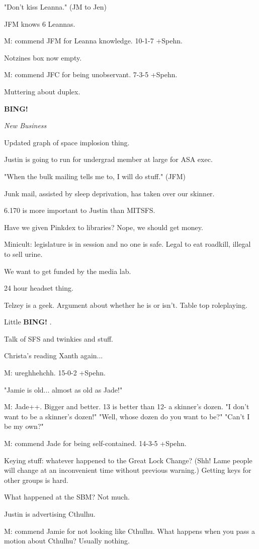 \documentclass[12pt]{article}
\newcommand{\bing}{{\bf BING!} }
\newcommand{\goto}[1]{\bing \vskip 12pt \centerline{{\em{#1}}}}
\begin{document}
"Don't kiss Leanna." (JM to Jen)

JFM knows 6 Leannas.

M: commend JFM for Leanna knowledge. 10-1-7 +Spehn.

Notzines box now empty.

M: commend JFC for being unobservant. 7-3-5 +Spehn.

Muttering about duplex.

\goto{New Business}

Updated graph of space implosion thing.

Justin is going to run for undergrad member at large for ASA exec.

"When the bulk mailing tells me to, I will do stuff." (JFM)

Junk mail, assisted by sleep deprivation, has taken over our skinner.

6.170 is more important to Justin than MITSFS.

Have we given Pinkdex to libraries? Nope, we should get money.

Minicult: legislature is in session and no one is safe. Legal to eat roadkill, illegal to sell urine.

We want to get funded by the media lab.

24 hour headset thing.

Telzey is a geek. Argument about whether he is or isn't. Table top roleplaying.

Little \bing.

Talk of SFS and twinkies and stuff.

Christa's reading Xanth again...

M: ureghhehchh. 15-0-2 +Spehn.

"Jamie is old... almost as old as Jade!"

M: Jade++. Bigger and better. 13 is better than 12- a skinner's dozen. "I don't want to be a skinner's dozen!" "Well, whose dozen do you want to be?" "Can't I be my own?"

M: commend Jade for being self-contained. 14-3-5 +Spehn.

Keying stuff: whatever happened to the Great Lock Change? (Shh! Lame people will change at an inconvenient time without previous warning.) Getting keys for other groups is hard.

What happened at the SBM? Not much.

Justin is advertising Cthulhu.

M: commend Jamie for not looking like Cthulhu. What happens when you pass a motion about Cthulhu? Usually nothing.
\end{document}
